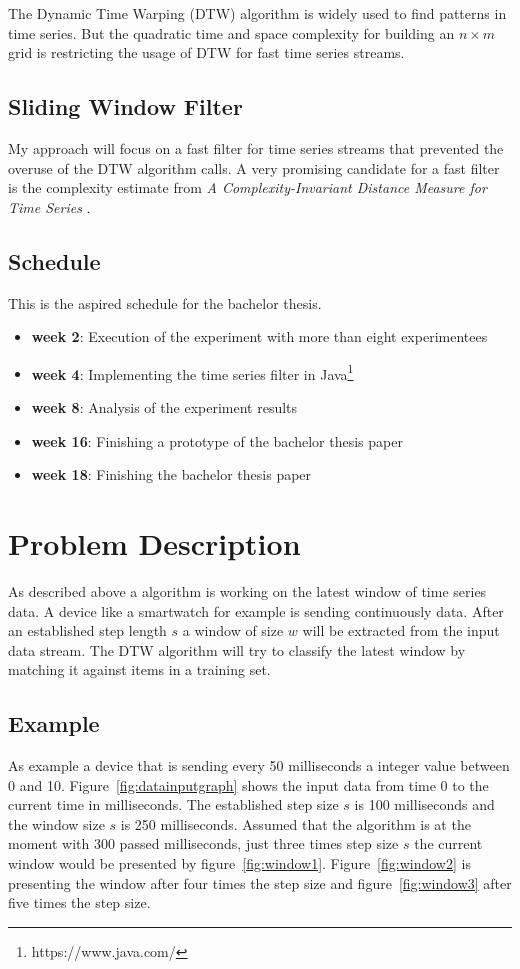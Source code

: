 \documentclass[runningheads,a4paper]{llncs}
\begin{document}
    The Dynamic Time Warping \cite{berndt1994using} (DTW) algorithm is widely used
    to find patterns in time series. But the quadratic time and space complexity for building an $n \times m$ grid is
    restricting the usage of DTW for fast time series streams.

    \subsection{Sliding Window Filter}
    My approach will focus on a fast filter for time series streams that prevented the overuse of the DTW algorithm
    calls. A very promising candidate for a fast filter is the complexity estimate from
    \textit{A Complexity-Invariant Distance Measure for Time Series} \cite{batista2011complexity}.

    \subsection{Schedule}
    This is the aspired schedule for the bachelor thesis.
    \begin{itemize}
        \item \textbf{week 2}: Execution of the experiment with more than eight experimentees
        \item \textbf{week 4}: Implementing the time series filter in Java\footnote{https://www.java.com/}
        \item \textbf{week 8}: Analysis of the experiment results
        \item \textbf{week 16}: Finishing a prototype of the bachelor thesis paper
        \item \textbf{week 18}: Finishing the bachelor thesis paper
    \end{itemize}

    \section{Problem Description}
    As described above a algorithm is working on the latest window of time series data. A device like a smartwatch for
    example is sending continuously data. After an established step length $s$ a window of size $w$ will be extracted
    from the input data stream. The DTW algorithm will try to classify the latest window by matching it against items
    in a training set.

    \subsection{Example}
    As example a device that is sending every 50 milliseconds a integer value between 0 and 10.
    Figure~\ref{fig:datainputgraph} shows the input data from time 0 to the current time in milliseconds. The
    established step size $s$ is 100 milliseconds and the window size $s$ is 250 milliseconds. Assumed that the
    algorithm is at the moment with 300 passed milliseconds, just three times step size $s$ the current window would be
    presented by figure~\ref{fig:window1}. Figure~\ref{fig:window2} is presenting the window after four times the step
    size and figure~\ref{fig:window3} after five times the step size.
\end{document}
